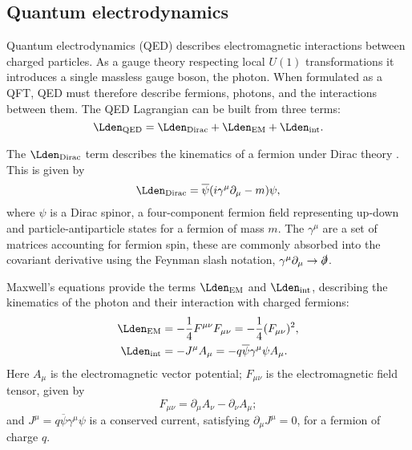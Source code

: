 \subsection{Quantum electrodynamics}

Quantum electrodynamics (QED) describes electromagnetic interactions
between charged particles.  As a gauge theory respecting local $U(1)$
transformations it introduces a single massless gauge boson, the photon. When
formulated as a \ac{QFT}, \ac{QED} must therefore describe fermions, photons,
and the interactions between them.  The \ac{QED} Lagrangian can be built from
three terms:
\newcommand\LQED{\ensuremath{\Lden_\text{QED}}\xspace}
\newcommand\LDirac{\ensuremath{\Lden_\text{Dirac}}\xspace}
\newcommand\LEM{\ensuremath{\Lden_\text{EM}}\xspace}
\newcommand\Lint{\ensuremath{\Lden_\text{int}}\xspace}
%
\begin{equation*}
  \LQED = \LDirac + \LEM + \Lint.
\end{equation*}
%

The \LDirac term describes the kinematics of a fermion under Dirac theory
\cite{Dirac1930}. This is given by
%
\begin{equation*}
  \LDirac = \overline{\psi}(i\gamma^\mu\partial_\mu - m)\psi,
\end{equation*}
where $\psi$ is a Dirac spinor, a four-component fermion field representing
up-down and particle-antiparticle states for a fermion of mass $m$. The
$\gamma^\mu$ are a set of matrices accounting for fermion spin, these are
commonly absorbed into the covariant derivative using the Feynman slash
notation, $\gamma^\mu\partial_\mu \to \slashed{\partial}$.

Maxwell's equations provide the terms \LEM and \Lint, describing the kinematics
of the photon and their interaction with charged fermions:
%
\begin{align*}
  \LEM  &= -\frac14 F^{\mu\nu}F_{\mu\nu} = -\frac14 (F_{\mu\nu})^2, \\
  \Lint &= -J^\mu A_\mu = -q\overline{\psi}\gamma^\mu\psi A_\mu.
\end{align*}
%
Here $A_\mu$ is the electromagnetic vector potential; $F_{\mu\nu}$ is the
electromagnetic field tensor, given by
\begin{equation}
  F_{\mu\nu} = \partial_\mu A_\nu - \partial_\nu A_\mu;
  \label{eqn:theory-theories-qed-fieldstrength}
\end{equation}
and $J^\mu = q\overline{\psi}\gamma^\mu\psi$ is a conserved current, satisfying
$\partial_\mu J^\mu = 0$, for a fermion of charge $q$.

